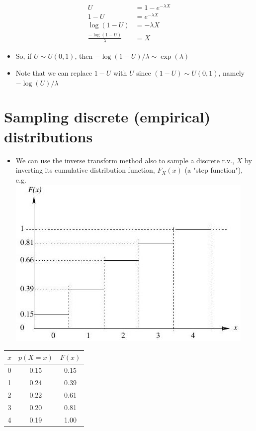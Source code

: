 \documentclass[10pt]{article}
\begin{document}
$$
\begin{aligned}
U & =1-e^{-\lambda X} \\
1-U & =e^{-\lambda X} \\
\log (1-U) & =-\lambda X \\
\frac{-\log (1-U)}{\lambda} & =X
\end{aligned}
$$

\begin{itemize}
  \item So, if $U \sim U(0,1)$, then $-\log (1-U) / \lambda \sim \exp (\lambda)$
  \item Note that we can replace $1-U$ with $U$ since $(1-U) \sim U(0,1)$, namely $-\log (U) / \lambda$
\end{itemize}

\section*{Sampling discrete (empirical) distributions}
\begin{itemize}
  \item We can use the inverse transform method also to sample a discrete r.v., $X$ by inverting its cumulative distribution function, $F_{X}(x)$ (a "step function"), e.g.\\
\includegraphics[max width=\textwidth, center]{2025_05_12_520db7cd238ba7b44f0fg-37}
\end{itemize}

\begin{center}
\begin{tabular}{|c|cc|}
\hline
$x$ & $p(X=x)$ & $F(x)$ \\
\hline
0 & 0.15 & 0.15 \\
1 & 0.24 & 0.39 \\
2 & 0.22 & 0.61 \\
3 & 0.20 & 0.81 \\
4 & 0.19 & 1.00 \\
\hline
\end{tabular}
\end{center}
\end{document}
